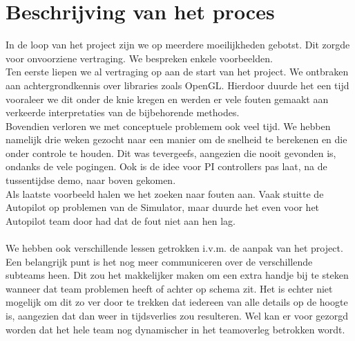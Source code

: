 \documentclass[]{penoverslag}
\begin{document}
\maketitlepage




\newpage\makeappendix

\section{Beschrijving van het proces}
In de loop van het project zijn we op meerdere moeilijkheden gebotst. Dit zorgde voor onvoorziene vertraging. We bespreken enkele voorbeelden.
\\
Ten eerste liepen we al vertraging op aan de start van het project. We ontbraken aan achtergrondkennis over libraries zoals OpenGL. Hierdoor duurde het een tijd vooraleer we dit onder de knie kregen en werden er vele fouten gemaakt aan verkeerde interpretaties van de bijbehorende methodes.
\\
Bovendien verloren we met conceptuele problemem ook veel tijd. We hebben namelijk drie weken gezocht naar een manier om de snelheid te berekenen en die onder controle te houden. Dit was tevergeefs, aangezien die nooit gevonden is, ondanks de vele pogingen. Ook is de idee voor PI controllers pas laat, na de tussentijdse demo, naar boven gekomen.
\\
Als laatste voorbeeld halen we het zoeken naar fouten aan. Vaak stuitte de Autopilot op problemen van de Simulator, maar duurde het even voor het Autopilot team door had dat de fout niet aan hen lag.
\\
\\
We hebben ook verschillende lessen getrokken i.v.m. de aanpak van het project. 
Een belangrijk punt is het nog meer communiceren over de verschillende subteams heen. Dit zou het makkelijker maken om een extra handje bij te steken wanneer dat team problemen heeft of achter op schema zit. Het is echter niet mogelijk om dit zo ver door te trekken dat iedereen van alle details op de hoogte is, aangezien dat dan weer in tijdsverlies zou resulteren. Wel kan er voor gezorgd worden dat het hele team nog dynamischer in het teamoverleg betrokken wordt.
\\
\\
\end{document}
